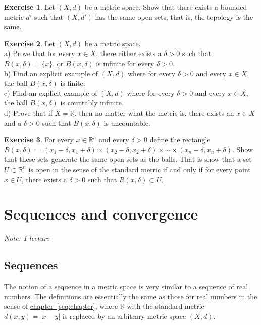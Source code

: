 \documentclass[12pt]{book}
\newcommand{\abs}[1]{\left\lvert {#1} \right\rvert}
\newcommand{\R}{{\mathbb{R}}}
\newcommand{\sectionnotes}[1]{\noindent \emph{Note: #1} \medskip \par}
\newcommand{\sectionnewpage}{\clearpage}
\theoremstyle{plain}
\theoremstyle{remark}
\theoremstyle{definition}
\theoremstyle{exercise}
\newtheorem{exercise}{Exercise}[section]
\theoremstyle{example}
\newcommand{\chapterref}[1]{\hyperref[#1]{chapter~\ref*{#1}}}
\begin{document}
\begin{exercise}
Let $(X,d)$ be a metric space.  Show that there exists a bounded metric
$d'$ such that $(X,d')$ has the same open sets, that is, the topology is
the same.
\end{exercise}

\begin{exercise}
Let $(X,d)$ be a metric space.\\
a) Prove that for every $x \in X$, there either exists a $\delta > 0$ such that
$B(x,\delta) = \{ x \}$, or $B(x,\delta)$ is infinite for every $\delta >  0$.
\\
b) Find an explicit example of $(X,d)$ where for every $\delta > 0$ and
every $x \in X$, the
ball $B(x,\delta)$ is finite.
\\
c) Find an explicit example of $(X,d)$ where for every $\delta > 0$ and
every $x \in X$, the
ball $B(x,\delta)$ is countably infinite.
\\
d) Prove that if $X = \R$, then no matter what the metric is, there exists
an $x \in X$ and a $\delta > 0$ such that $B(x,\delta)$ is uncountable.
\end{exercise}

\begin{exercise}
For every $x \in \R^n$ and every $\delta > 0$ define the rectangle
$R(x,\delta) :=
(x_1-\delta,x_1+\delta) \times
(x_2-\delta,x_2+\delta) \times \cdots \times
(x_n-\delta,x_n+\delta)$.  Show that these sets generate the same open
sets as the balls.  That is show that a set $U \subset \R^n$
is open in the sense of the standard metric if and only if for every
point $x \in U$, there exists a $\delta > 0$ such that $R(x,\delta) \subset
U$.
\end{exercise}


\sectionnewpage
\section{Sequences and convergence}
\label{sec:metseqs}

\sectionnotes{1 lecture}

\subsection{Sequences}

The notion of a sequence in a metric space is very similar to a sequence of
real numbers.
The definitions are essentially the same as those for real numbers
in the sense of \chapterref{seq:chapter}, where $\R$ with
the standard metric $d(x,y)=\abs{x-y}$ is replaced
by an arbitrary metric space $(X,d)$.
\end{document}
